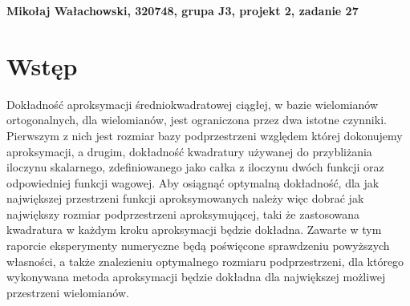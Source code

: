 \documentclass[a4paper,12pt]{article}
\begin{document}
\def\tablename{Tabela} %


\noindent
\textbf{Mikołaj Wałachowski, 320748, grupa J3, projekt 2, zadanie 27}


\section*{Wstęp}
Dokładność aproksymacji średniokwadratowej ciągłej, w bazie wielomianów ortogonalnych, dla wielomianów, jest ograniczona przez dwa istotne czynniki. Pierwszym z nich jest rozmiar bazy podprzestrzeni względem której dokonujemy aproksymacji, a drugim, dokładność kwadratury używanej do przybliżania iloczynu skalarnego, zdefiniowanego jako całka z iloczynu dwóch funkcji oraz odpowiedniej funkcji wagowej. Aby osiągnąć optymalną dokładność, dla jak największej przestrzeni funkcji aproksymowanych należy więc dobrać jak największy rozmiar podprzestrzeni aproksymującej, taki że zastosowana kwadratura w każdym kroku aproksymacji będzie dokładna. Zawarte w tym raporcie eksperymenty numeryczne będą poświęcone sprawdzeniu powyższych własności, a także znalezieniu optymalnego rozmiaru podprzestrzeni, dla którego wykonywana metoda aproksymacji będzie dokładna dla największej możliwej przestrzeni wielomianów. 
\end{document}
